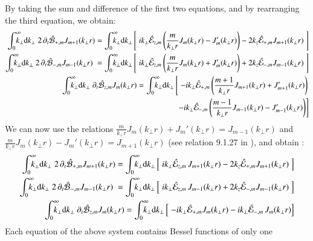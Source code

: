 By taking the sum and difference of the first two equations, and by
rearranging the third equation, we obtain:
\begin{subequations}
\begin{align}
\RInteg{k_\perp } \; 2 \,\partial_t \spectral{B}_{+,m}  J_{m+1}(k_\perp r) =
\RInteg{k_\perp } \left[ \; ik_\perp \spectral{E}_{z,m} \left( \frac{m}{k_\perp r} J_m(k_\perp r) -
    J_m'(k_\perp r) \right) -2 k_z\spectral{E}_{+,m}J_{m+1}(k_\perp r) \;
\right] \\
\RInteg{k_\perp } \; 2\, \partial_t \spectral{B}_{-,m}  J_{m-1}(k_\perp r) \; =
\RInteg{k_\perp } \left[ \;
   ik_\perp \spectral{E}_{z,m} \left( \frac{m}{k_\perp r} J_m(k_\perp r) +
    J_m'(k_\perp r) \right)  + 2k_z\spectral{E}_{-,m}J_{m-1}(k_\perp r) \;
\right] \\
\RInteg{k_\perp }\; \partial_t \spectral{B}_{z,m}  J_{m}(k_\perp r) =
\RInteg{k_\perp } \left[ \; -ik_\perp \spectral{E}_{+,m}\left(\frac{m+1}{k_\perp r}J_{m+1}(k_\perp r) +
    J_{m+1}'(k_\perp r) \right) \right.\nonumber \\
\qquad \left. - ik_\perp \spectral{E}_{-,m}\left(\frac{m-1}{k_\perp r}J_{m-1}(k_\perp r) -
    J_{m-1}'(k_\perp r) \right) \right] 
\end{align}
\end{subequations}
We can now use the relations $\frac{m}{k_\perp r} J_m(k_\perp r) +
    J_m'(k_\perp r) = J_{m-1}(k_\perp r)$ and $\frac{m}{k_\perp r} J_m(k_\perp r) -
    J_m'(k_\perp r) = J_{m+1}(k_\perp r)$ (see relation 9.1.27 in
    \cite{Abramowitz}), and obtain :
\begin{subequations}
\begin{align}
\RInteg{k_\perp } \; 2 \,\partial_t \spectral{B}_{+,m}  J_{m+1}(k_\perp r) =
\RInteg{k_\perp } \left[ \; ik_\perp \spectral{E}_{z,m}\,
    J_{m+1}(k_\perp r) -2 k_z\spectral{E}_{+,m}J_{m+1}(k_\perp r) \;
\right] \\
\RInteg{k_\perp } \; 2\, \partial_t \spectral{B}_{-,m}  J_{m-1}(k_\perp r) \; =
\RInteg{k_\perp } \left[ \;
   ik_\perp \spectral{E}_{z,m} \,
    J_{m-1}(k_\perp r) + 2k_z\spectral{E}_{-,m}J_{m-1}(k_\perp r) \;
\right] \\
\RInteg{k_\perp }\; \partial_t \spectral{B}_{z,m}  J_{m}(k_\perp r) =
\RInteg{k_\perp } \left[ \; -ik_\perp \spectral{E}_{+,m} J_{m}(k_\perp r) - ik_\perp \spectral{E}_{-,m}\,J_{m}(k_\perp r) \right] 
\end{align}
\end{subequations}
Each equation of the above system contains Bessel functions of only one
